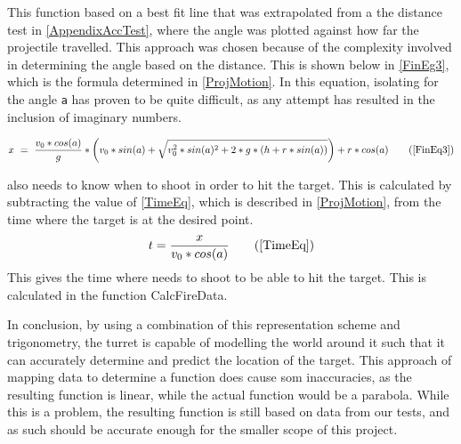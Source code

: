 This function based on a best fit line that was extrapolated from a the distance
test in \autoref{AppendixAccTest}, where the angle was plotted against how far
the projectile travelled. This approach was chosen because of the complexity
involved in determining the angle based on the distance. This is shown below in
\autoref{FinEg3}, which is the formula determined in \autoref{ProjMotion}. In
this equation, isolating for the angle \texttt{a} has proven to be quite difficult,
as any attempt has resulted in the inclusion of imaginary numbers.

\begin{equation*}
x\ =\ \frac{v_0*cos(a)}{g}* \left(
v_0*sin(a)+\sqrt{v_0^2*sin(a)^2+2*g*(h+r*sin(a))}\right)+r*cos(a)
\tag{\ref*{FinEq3}}
\end{equation*}

\name also needs to know when to shoot in order to hit the target.
This is calculated by subtracting the value of \autoref{TimeEq}, which is described in
\autoref{ProjMotion}, from the time where the target is at the desired point.
\begin{equation*}
t=\frac{x}{v_0*cos(a)}
\tag{\ref{TimeEq}}
\end{equation*}
This gives the time where \name needs to shoot to be able to hit the target.
This is calculated in the function CalcFireData.\nl

In conclusion, by using a combination of this representation scheme and
trigonometry, the turret is capable of modelling the world around it such that
it can accurately determine and predict the location of the target. This
approach of mapping data to determine a function does cause som inaccuracies, as
the resulting function is linear, while the actual function would be a parabola.
While this is a problem, the resulting function is still based on data from our
tests, and as such should be accurate enough for the smaller scope of this
project.
